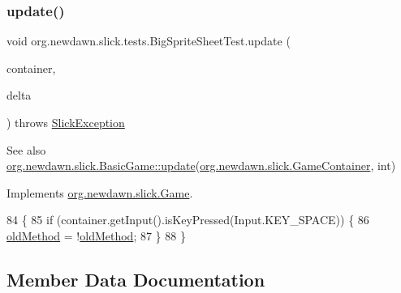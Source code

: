 \subsubsection{\texorpdfstring{update()}{update()}}
{\footnotesize\ttfamily void org.\+newdawn.\+slick.\+tests.\+Big\+Sprite\+Sheet\+Test.\+update (\begin{DoxyParamCaption}\item[{\mbox{\hyperlink{classorg_1_1newdawn_1_1slick_1_1_game_container}{Game\+Container}}}]{container,  }\item[{int}]{delta }\end{DoxyParamCaption}) throws \mbox{\hyperlink{classorg_1_1newdawn_1_1slick_1_1_slick_exception}{Slick\+Exception}}\hspace{0.3cm}{\ttfamily [inline]}}

\begin{DoxySeeAlso}{See also}
\mbox{\hyperlink{classorg_1_1newdawn_1_1slick_1_1_basic_game_acfe6fa05aef83bff1631af91a3e4bd20}{org.\+newdawn.\+slick.\+Basic\+Game\+::update}}(\mbox{\hyperlink{classorg_1_1newdawn_1_1slick_1_1_game_container}{org.\+newdawn.\+slick.\+Game\+Container}}, int) 
\end{DoxySeeAlso}


Implements \mbox{\hyperlink{interfaceorg_1_1newdawn_1_1slick_1_1_game_ab07b2e9463ee4631620dde0de25bdee8}{org.\+newdawn.\+slick.\+Game}}.


\begin{DoxyCode}
84                                                                                  \{
85         \textcolor{keywordflow}{if} (container.getInput().isKeyPressed(Input.KEY\_SPACE)) \{
86             \mbox{\hyperlink{classorg_1_1newdawn_1_1slick_1_1tests_1_1_big_sprite_sheet_test_a387c33f1a35dd5534111efcb232d32d9}{oldMethod}} = !\mbox{\hyperlink{classorg_1_1newdawn_1_1slick_1_1tests_1_1_big_sprite_sheet_test_a387c33f1a35dd5534111efcb232d32d9}{oldMethod}};
87         \}
88     \}
\end{DoxyCode}


\subsection{Member Data Documentation}
\mbox{\label{classorg_1_1newdawn_1_1slick_1_1tests_1_1_big_sprite_sheet_test_a676326fb3aeb2466aed58dc794d5bb66}} 
